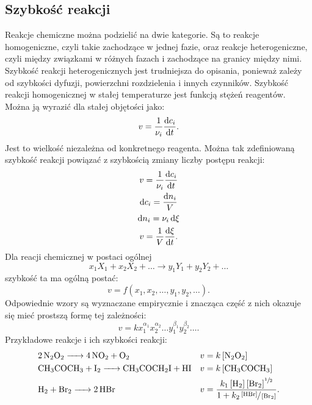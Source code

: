 \documentclass[10pt, a4paper, twoside, onecolumn]{article}
\numberwithin{equation}{section}
\begin{document}
	\subsection{Szybkość reakcji}
	Reakcje chemiczne można podzielić na dwie kategorie. Są to reakcje homogeniczne, czyli takie zachodzące w jednej fazie, oraz reakcje heterogeniczne, czyli między związkami w różnych fazach i zachodzące na granicy między nimi. Szybkość reakcji heterogenicznych jest trudniejsza do opisania, ponieważ zależy od szybkości dyfuzji, powierzchni rozdzielenia i innych czynników. %
	Szybkość reakcji homogenicznej w stałej temperaturze jest funkcją stężeń reagentów. Można ją wyrazić dla stałej objętości jako: 
	\begin{equation}
		v=\frac{1}{\nu_i}\dv{c_i}{t}.
	\end{equation}
	Jest to wielkość niezależna od konkretnego reagenta. Można tak zdefiniowaną szybkość reakcji powiązać z szybkością zmiany liczby postępu reakcji:
	\begin{gather}
		v=\frac{1}{\nu_{i}}\dv{c_{i}}{t} \\
		\dd{c_{i}}=\frac{\dd{n_{i}}}{V} \\
		\dd{n_{i}}=\nu_{i}\dd{\xi} \\
		v=\frac{1}{V}\dv{\xi}{t}.
	\end{gather}
	Dla reacji chemicznej w postaci ogólnej
	\begin{equation*}
		x_{1}X_{1}+x_{2}X_{2}+\ldots \rightarrow y_{1}Y_{1}+y_{2}Y_{2}+\ldots
	\end{equation*}
	szybkość ta ma ogólną postać:
	\begin{equation*}
		v=f\left(x_{1}, x_{2}, \ldots, y_{1}, y_{2}, \ldots\right).
	\end{equation*}
	Odpowiednie wzory są wyznaczane empirycznie i znacząca część z nich okazuje się mieć prostszą formę tej zależności:
	\begin{equation}\label{szybkosc reakcji}
		v=k x_{1}^{\alpha_1}x_{2}^{\alpha_2}\ldots y_{1}^{\beta_1}y_{2}^{\beta_2}\ldots.
	\end{equation}
	Przykładowe reakcje i ich szybkości reakcji:
	\begin{align*}
		&\ce{2N2O2 -> 4NO2 + O2} &&v=k\left[\ce{N2O2}\right] \\
		&\ce{CH3COCH3 + I2 -> CH3COCH2I + HI} &&v=k\left[\ce{CH3COCH3}\right] \\
		&\ce{H2 + Br2 -> 2HBr} &&v=\frac{k_{1}\left[\ce{H2}\right]\left[\ce{Br2}\right]^{\sfrac{1}{2}}}{1+k_{2}\sfrac{\left[\ce{HBr}\right]}{\left[\ce{Br2}\right]}}.
	\end{align*}
\end{document}
